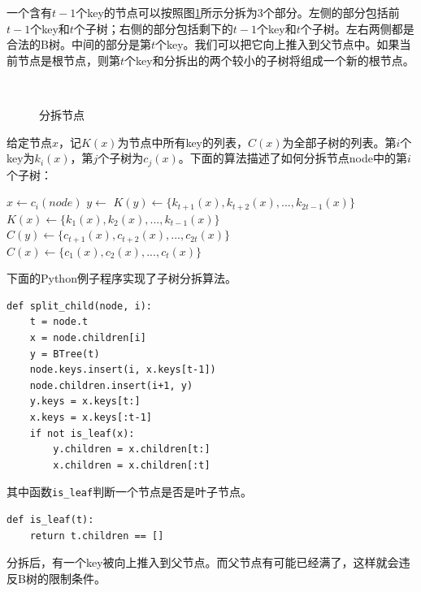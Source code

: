 \documentclass{ctexart}
\begin{document}
一个含有$t-1$个key的节点可以按照图\ref{fig:node-split}所示分拆为3个部分。左侧的部分包括前$t-1$个key和$t$个子树；右侧的部分包括剩下的$t-1$个key和$t$个子树。左右两侧都是合法的B树。中间的部分是第$t$个key。我们可以把它向上推入到父节点中。如果当前节点是根节点，则第$t$个key和分拆出的两个较小的子树将组成一个新的根节点。

\begin{figure}[htbp]
  \centering
   \\
  \caption{分拆节点}
  \label{fig:node-split}
\end{figure}

给定节点$x$，记$K(x)$为节点中所有key的列表，$C(x)$为全部子树的列表。第$i$个key为$k_i(x)$，第$j$个子树为$c_j(x)$。下面的算法描述了如何分拆节点node中的第$i$个子树：

\begin{algorithmic}[1]
  \State $x \gets c_i(node)$
  \State $y \gets$ 
  \State {}
  \State {}
  \State $K(y) \gets \{k_{t+1}(x), k_{t+2}(x), ..., k_{2t-1}(x)\}$
  \State $K(x) \gets \{k_1(x), k_2(x), ..., k_{t-1}(x)\}$
    \State $C(y) \gets \{c_{t+1}(x), c_{t+2}(x), ..., c_{2t}(x)\}$
    \State $C(x) \gets \{c_1(x), c_2(x), ..., c_t(x)\}$
  \EndIf
\EndProcedure
\end{algorithmic}

下面的Python例子程序实现了子树分拆算法。

\lstset{language=Python}
\begin{lstlisting}
def split_child(node, i):
    t = node.t
    x = node.children[i]
    y = BTree(t)
    node.keys.insert(i, x.keys[t-1])
    node.children.insert(i+1, y)
    y.keys = x.keys[t:]
    x.keys = x.keys[:t-1]
    if not is_leaf(x):
        y.children = x.children[t:]
        x.children = x.children[:t]
\end{lstlisting}

其中函数\texttt{is\_leaf}判断一个节点是否是叶子节点。

\lstset{language=Python}
\begin{lstlisting}
def is_leaf(t):
    return t.children == []
\end{lstlisting}

\label{split}

分拆后，有一个key被向上推入到父节点。而父节点有可能已经满了，这样就会违反B树的限制条件。
\end{document}
